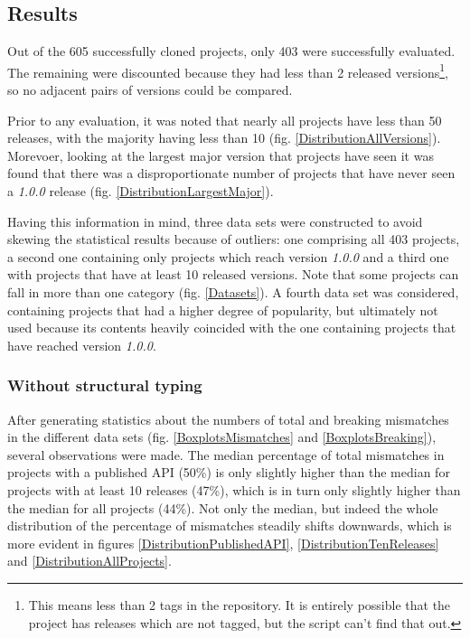 \documentclass{l4proj}
\begin{document}
\subsection{Results}

Out of the 605 successfully cloned projects, only 403 were
successfully evaluated. The remaining were discounted because they had
less than 2 released versions\footnote{This means less than 2 tags in
the repository. It is entirely possible that the project has releases
which are not tagged, but the script can't find that out.}, so no
adjacent pairs of versions could be compared.

Prior to any evaluation, it was noted that nearly all projects have
less than 50 releases, with the majority having less than 10 (fig.
\ref{DistributionAllVersions}). Morevoer, looking at the largest major
version that projects have seen it was found that there was a
disproportionate number of projects that have never seen a
\textit{1.0.0} release (fig. \ref{DistributionLargestMajor}).

Having this information in mind, three data sets were constructed to
avoid skewing the statistical results because of outliers: one
comprising all 403 projects, a second one containing only projects
which reach version \textit{1.0.0} and a third one with projects that
have at least 10 released versions. Note that some projects can fall
in more than one category (fig. \ref{Datasets}). A fourth data set was
considered, containing projects that had a higher degree of
popularity, but ultimately not used because its contents heavily
coincided with the one containing projects that have reached version
\textit{1.0.0}.

\subsubsection{Without structural typing}

After generating statistics about the numbers of total and breaking
mismatches in the different data sets (fig. \ref{BoxplotsMismatches}
and \ref{BoxplotsBreaking}), several observations were made. The
median percentage of total mismatches in projects with a published API
(50\%) is only slightly higher than the median for projects with at
least 10 releases (47\%), which is in turn only slightly higher than
the median for all projects (44\%). Not only the median, but indeed
the whole distribution of the percentage of mismatches steadily shifts
downwards, which is more evident in figures
\ref{DistributionPublishedAPI}, \ref{DistributionTenReleases} and
\ref{DistributionAllProjects}.
\end{document}

